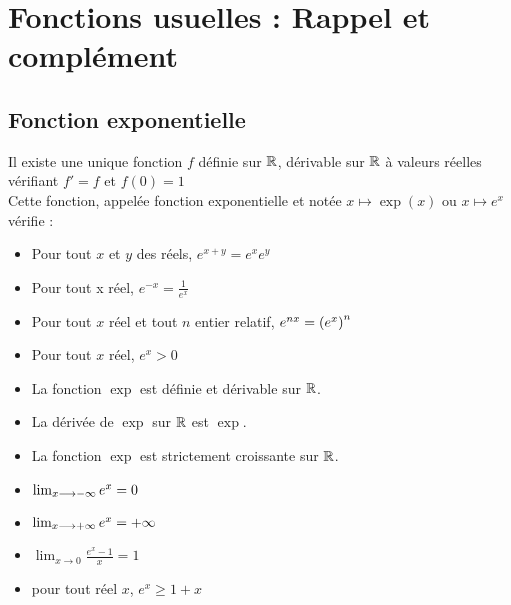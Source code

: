 \chapter{Fonctions usuelles : Rappel et complément}

\minitoc
\section{Fonction exponentielle}
\begin{defprop}
	Il existe une unique fonction \(f\) définie sur \(\mathbb{R}\), dérivable sur \(\mathbb{R}\) à valeurs réelles vérifiant \(f' = f\) et \(f(0) = 1\) \\
	Cette fonction, appelée fonction exponentielle et notée \(x\mapsto \exp(x)\) ou \(x\mapsto e^x\) vérifie :
	\begin{itemize}
		\item Pour tout \(x\) et \(y\) des réels, \(e^{x+y}  =e^xe^y\)
		\item Pour tout x réel, \(e^{-x} = \frac{1}{e^x} \)
		\item Pour tout \(x\) réel et tout \(n\) entier relatif, \(e^{nx} = \left(e^x\right)^n\)
		\item Pour tout \(x\) réel, \(e^x >0\)
		\item La fonction \(\exp\) est définie et dérivable sur \(\mathbb{R}\).
		\item La dérivée de \(\exp\) sur \(\mathbb{R}\) est \(\exp\).
		\item La fonction \(\exp\) est strictement croissante sur \(\mathbb{R}\).
		\item \(\lim_{x\longrightarrow-\infty}e^x =0\)
		\item \(\lim_{x\longrightarrow+\infty} e^x = +\infty \)
		\item \(\lim_{x\to 0} \frac{e^x-1}{x} = 1\)
		\item pour tout réel \(x\), \(e^x\geq 1+x\)
	\end{itemize}
\end{defprop}

